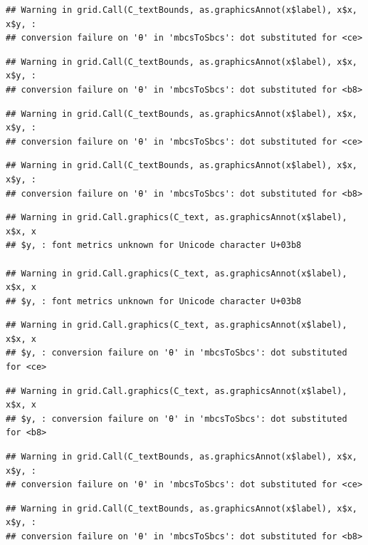 \documentclass[]{book}
\theoremstyle{definition}
\theoremstyle{definition}
\theoremstyle{definition}
\theoremstyle{remark}
\begin{document}
\begin{verbatim}
## Warning in grid.Call(C_textBounds, as.graphicsAnnot(x$label), x$x, x$y, :
## conversion failure on 'θ' in 'mbcsToSbcs': dot substituted for <ce>
\end{verbatim}

\begin{verbatim}
## Warning in grid.Call(C_textBounds, as.graphicsAnnot(x$label), x$x, x$y, :
## conversion failure on 'θ' in 'mbcsToSbcs': dot substituted for <b8>
\end{verbatim}

\begin{verbatim}
## Warning in grid.Call(C_textBounds, as.graphicsAnnot(x$label), x$x, x$y, :
## conversion failure on 'θ' in 'mbcsToSbcs': dot substituted for <ce>
\end{verbatim}

\begin{verbatim}
## Warning in grid.Call(C_textBounds, as.graphicsAnnot(x$label), x$x, x$y, :
## conversion failure on 'θ' in 'mbcsToSbcs': dot substituted for <b8>
\end{verbatim}

\begin{verbatim}
## Warning in grid.Call.graphics(C_text, as.graphicsAnnot(x$label), x$x, x
## $y, : font metrics unknown for Unicode character U+03b8

## Warning in grid.Call.graphics(C_text, as.graphicsAnnot(x$label), x$x, x
## $y, : font metrics unknown for Unicode character U+03b8
\end{verbatim}

\begin{verbatim}
## Warning in grid.Call.graphics(C_text, as.graphicsAnnot(x$label), x$x, x
## $y, : conversion failure on 'θ' in 'mbcsToSbcs': dot substituted for <ce>
\end{verbatim}

\begin{verbatim}
## Warning in grid.Call.graphics(C_text, as.graphicsAnnot(x$label), x$x, x
## $y, : conversion failure on 'θ' in 'mbcsToSbcs': dot substituted for <b8>
\end{verbatim}

\begin{verbatim}
## Warning in grid.Call(C_textBounds, as.graphicsAnnot(x$label), x$x, x$y, :
## conversion failure on 'θ' in 'mbcsToSbcs': dot substituted for <ce>
\end{verbatim}

\begin{verbatim}
## Warning in grid.Call(C_textBounds, as.graphicsAnnot(x$label), x$x, x$y, :
## conversion failure on 'θ' in 'mbcsToSbcs': dot substituted for <b8>
\end{verbatim}
\end{document}
